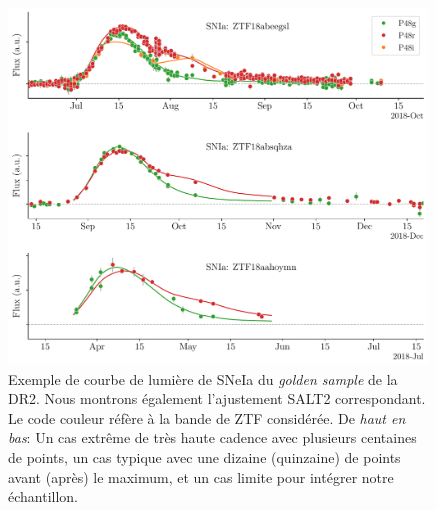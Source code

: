 \documentclass[../main/main.tex]{subfiles}
\begin{document}
\begin{figure}[ht!]
  \centering
  \includegraphics[width=0.99\textwidth]{../figures/09_dr2/lightcurve_example_dr2.pdf}
  \caption[Exemple de courbe de lumière de SNeIa du \textit{golden
    sample} de la DR2.]{Exemple de courbe de lumière de SNeIa du
    \textit{golden sample} de la DR2. Nous montrons également
    l'ajustement SALT2 correspondant. Le code couleur réfère à la bande
    de ZTF considérée. De \emph{haut en bas}: Un cas extrême de très
    haute cadence avec plusieurs centaines de points, un cas typique
    avec une dizaine (quinzaine) de points avant (après) le maximum, et
    un cas limite pour intégrer notre échantillon.}
  \label{fig:lc_example}
\end{figure}
\end{document}
